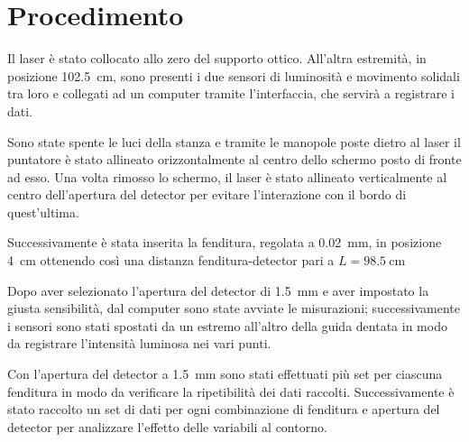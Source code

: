 \documentclass[../main.tex]{subfiles}
\begin{document}
\section{Procedimento}

Il laser è stato collocato allo zero del supporto ottico. All’altra estremità, in posizione \qty{102.5}{\cm}, sono presenti i due sensori di luminosità e movimento solidali tra loro e collegati ad un computer tramite l’interfaccia, che servirà a registrare i dati.

Sono state spente le luci della stanza e tramite le manopole poste dietro al laser il puntatore è stato allineato orizzontalmente al centro dello schermo posto di fronte ad esso. Una volta rimosso lo schermo, il laser è stato allineato verticalmente al centro dell'apertura del detector per evitare l'interazione con il bordo di quest'ultima.

Successivamente è stata inserita la fenditura, regolata a \qty{0.02}{\milli\meter}, in posizione \qty{4}{\cm} ottenendo così una distanza fenditura-detector pari a $L = \qty{98.5}{\cm}$

Dopo aver selezionato l’apertura del detector di \qty{1.5}{\milli\meter} e aver impostato la giusta sensibilità, dal computer sono state avviate le misurazioni; successivamente i sensori sono stati spostati da un estremo all’altro della guida dentata in modo da registrare l'intensità luminosa nei vari punti.

Con l'apertura del detector a \qty{1.5}{\milli\meter} sono stati effettuati più set per ciascuna fenditura in modo da verificare la ripetibilità dei dati raccolti. Successivamente è stato raccolto un set di dati per ogni combinazione di fenditura e apertura del detector per analizzare l'effetto delle variabili al contorno.

\end{document}
